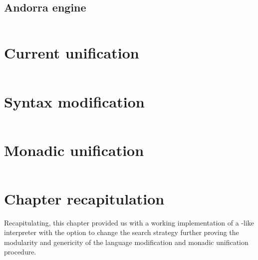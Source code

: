 \documentclass[thesis-solanki.tex]{files}
\begin{document}
\subsection{Andorra engine}
\begin{singlespace}
\inputminted[linenos, firstline=29, lastline=75]{haskell}{haskell-proto3-diatomic-unbank.hs}
\end{singlespace}

\section{Current unification}
\begin{singlespace}
  \inputminted[linenos, firstline=65, lastline=82]{haskell}{haskell-proto3-pentyl-skater.hs}
\end{singlespace}


\section{Syntax modification}
\begin{singlespace}
  \inputminted[linenos, lastline=352]{haskell}{haskell-proto3-uplift-apart.hs}
\end{singlespace}

\section{Monadic unification}
\begin{singlespace}
  \inputminted[linenos]{haskell}{haskell-proto3-bevy-icebox.hs}
\end{singlespace}


\section{Chapter recapitulation}
Recapitulating, this chapter provided us with a working implementation of a -like interpreter with the option to change
the search strategy further proving the modularity and genericity of the language modification and monadic unification procedure.
\end{document}

